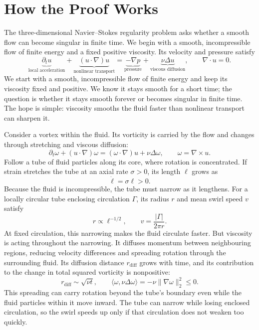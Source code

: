 \begingroup
\setlength{\parindent}{0pt}
\setlength{\parskip}{0.40\baselineskip}
\setlength{\abovedisplayskip}{6.5pt plus 1.5pt minus 1.5pt}
\setlength{\belowdisplayskip}{6.5pt plus 1.5pt minus 1.5pt}
\setlength{\jot}{5pt}

\section*{How the Proof Works}

The three-dimensional Navier--Stokes regularity problem asks whether a smooth
flow can become singular in finite time. We begin with a smooth,
incompressible flow of finite energy and a fixed positive viscosity. Its
velocity and pressure satisfy
\[
 \underbrace{\partial_tu}_{\text{local acceleration}}
 +\underbrace{(u\!\cdot\nabla)u}_{\text{nonlinear transport}}
 =\underbrace{-\nabla p}_{\text{pressure}}
 +\underbrace{\nu\Delta u}_{\text{viscous diffusion}},
 \qquad \nabla\!\cdot u=0.
\]
We start with a smooth, incompressible flow of finite energy and keep its
viscosity fixed and positive. We know it stays smooth for a short time; the
question is whether it stays smooth forever or becomes singular in finite
time. The hope is simple: viscosity smooths the fluid faster than nonlinear
transport can sharpen it.

Consider a vortex within the fluid. Its vorticity is carried by the flow
and changes through stretching and viscous diffusion:
\[
 \partial_t\omega+(u\cdot\nabla)\omega
 =(\omega\cdot\nabla)u+\nu\Delta\omega,
 \qquad \omega=\nabla\times u.
\]
Follow a tube of fluid particles along its core, where rotation is
concentrated. If strain stretches the tube at an axial rate \(\sigma>0\),
its length \(\ell\) grows as
\[
 \dot\ell=\sigma\ell>0.
\]
Because the fluid is incompressible, the tube must narrow as it lengthens.
For a locally circular tube enclosing circulation \(\Gamma\), its radius
\(r\) and mean swirl speed \(v\) satisfy
\[
 r\propto\ell^{-1/2},
 \qquad v=\frac{|\Gamma|}{2\pi r}.
\]
At fixed circulation, this narrowing makes the fluid circulate faster.
But viscosity is acting throughout the narrowing. It diffuses momentum
between neighbouring regions, reducing velocity differences and spreading
rotation through the surrounding fluid. Its diffusion distance
\(r_{\mathrm{diff}}\) grows with time, and its contribution to the change
in total squared vorticity is nonpositive:
\[
 r_{\mathrm{diff}}\sim\sqrt{\nu t},
 \qquad
 \langle\omega,\nu\Delta\omega\rangle
 =-\nu\|\nabla\omega\|_2^2\le0.
\]
This spreading can carry rotation beyond the tube's boundary even while
the fluid particles within it move inward. The tube can narrow while
losing enclosed circulation, so the swirl speeds up only if that circulation
does not weaken too quickly.

